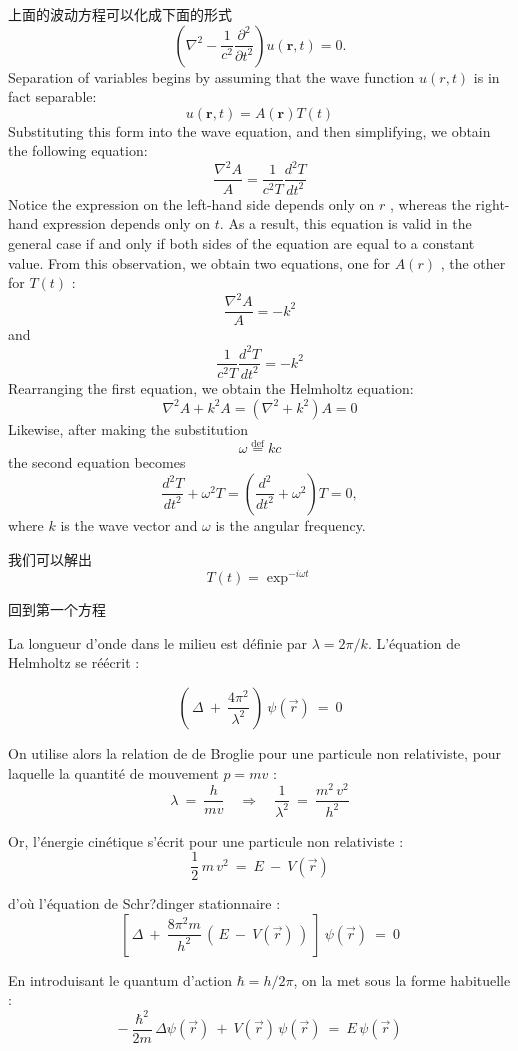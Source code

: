\documentclass[openany]{book}
\begin{document}
上面的波动方程可以化成下面的形式
$$
\left(\nabla^2-\frac{1}{c^2}\frac{\partial^2}{\partial{t}^2}\right)u(\mathbf{r},t)=0.
$$
Separation of variables begins by assuming that the wave function $u(r, t)$ is in fact separable:
$$u(\mathbf{r},t)=A (\mathbf{r}) T(t)$$
Substituting this form into the wave equation, and then simplifying, we obtain the following equation:
$$\dfrac{\nabla^2 A}{A} = \dfrac{1}{c^2 T } \dfrac{d^2 T}{d t^2}$$
Notice the expression on the left-hand side depends only on $r$ , whereas the right-hand expression depends only on $t$.
As a result, this equation is valid in the general case if and only if both sides of the equation are equal to a constant value. 
From this observation, we obtain two equations, one for $A(r)$ , the other for $T(t)$ :
$$\dfrac{\nabla^2 A}{A} = -k^2$$
and
$$\dfrac{1}{c^2 T } \dfrac{d^2 T}{d t^2} = -k^2$$
Rearranging the first equation, we obtain the Helmholtz equation:
$$\nabla^2 A + k^2 A  =  ( \nabla^2 + k^2)  A  =  0$$
Likewise, after making the substitution
$$ \omega  \stackrel{\mathrm{def}}{=}  kc $$
the second equation becomes
$$\frac{d^2{T}}{d{t}^2} + \omega^2T  =  \left( \dfrac{d^2 }{dt^2 } + \omega^2 \right) T  =  0,$$
where $k$ is the wave vector and $\omega$ is the angular frequency.\par
我们可以解出
$$
T(t) = \exp^{-i \omega t}
$$

回到第一个方程\par
La longueur d'onde dans le milieu est d\'efinie par $\lambda = 2 \pi/k$. L'\'equation de Helmholtz se r\'e\'ecrit :

$$
\left( \, \Delta \ + \ \frac{4\pi^2}{\lambda^2} \, \right) \ \psi(\vec{r}) \ = \ 0
$$

On utilise alors la relation de de Broglie pour une particule non relativiste, pour laquelle la quantit\'e de mouvement $p = m v$  :
$$
\lambda \ = \ \frac{h}{mv} \quad \Longrightarrow \quad \frac{1}{\lambda^2} \ = \ \frac{m^2 \, v^2}{h^2}
$$

Or, l'\'energie cin\'etique s'\'ecrit pour une particule non relativiste :
$$
\frac{1}{2} \, m \, v^2 \ = \ E \ - \ V(\vec{r})
$$

d'où l'\'equation de Schr?dinger stationnaire :
$$
\left[ \, \Delta \ + \ \frac{8\pi^2m}{h^2} \, \left( \, E \ - \ V(\vec{r}) \, \right) \ \right] \ \psi(\vec{r}) \ = \ 0
$$

En introduisant le quantum d'action $\hbar = h/2\pi$, on la met sous la forme habituelle :
$$
- \ \frac{\hbar^2}{2m} \, \Delta \psi(\vec{r}) \ + \ V(\vec{r}) \, \psi(\vec{r}) \ = \ E \, \psi(\vec{r})
$$
\end{document}
